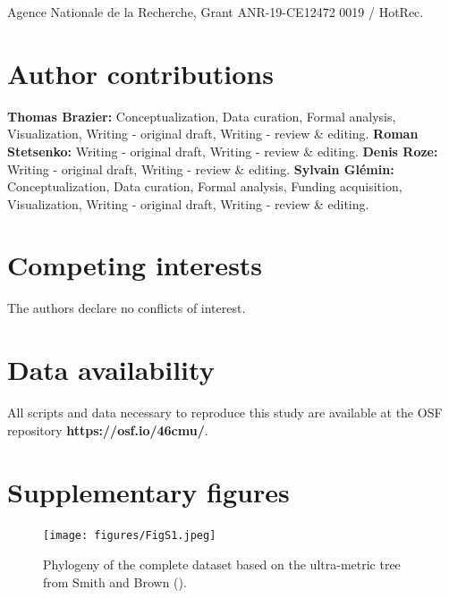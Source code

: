 \documentclass{article}
\begin{document}
Agence Nationale de la Recherche, Grant ANR-19-CE12472 0019 / HotRec. 


\section*{Author contributions}

\textbf{Thomas Brazier:} Conceptualization, Data curation, Formal analysis, Visualization, Writing - original draft, Writing - review \& editing. \textbf{Roman Stetsenko:} Writing - original draft, Writing - review \& editing. \textbf{Denis Roze:} Writing - original draft, Writing - review \& editing. \textbf{Sylvain Glémin:} Conceptualization, Data curation, Formal analysis, Funding acquisition, Visualization, Writing - original draft, Writing - review \& editing.


\section*{Competing interests}

The authors declare no conflicts of interest.


\section*{Data availability} 

All scripts and data necessary to reproduce this study are available at the OSF repository \textbf{https://osf.io/46cmu/}.


\printbibliography




\section*{Supplementary figures}

\renewcommand{\thefigure}{S\arabic{figure}}

\setcounter{figure}{0}


\begin{figure}[h!]
  \texttt{[image: figures/FigS1.jpeg]}
  \centering
  \caption{Phylogeny of the complete dataset based on the ultra-metric tree from Smith and Brown (\citeyear{smithConstructingBroadlyInclusive2018}).
  }
  \label{figure:FigS1}
\end{figure}
\end{document}
